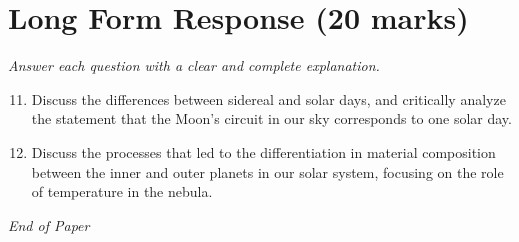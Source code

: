 \documentclass[12pt]{article}
\begin{document}
\section*{Long Form Response (20 marks)}
\textit{Answer each question with a clear and complete explanation.}
\begin{enumerate}[label=\arabic*.]
\setcounter{enumi}{10}
\item Discuss the differences between sidereal and solar days, and critically analyze the statement that the Moon's circuit in our sky corresponds to one solar day.
\item Discuss the processes that led to the differentiation in material composition between the inner and outer planets in our solar system, focusing on the role of temperature in the nebula.
\end{enumerate}

\vfill
\noindent\textit{End of Paper}
\end{document}
